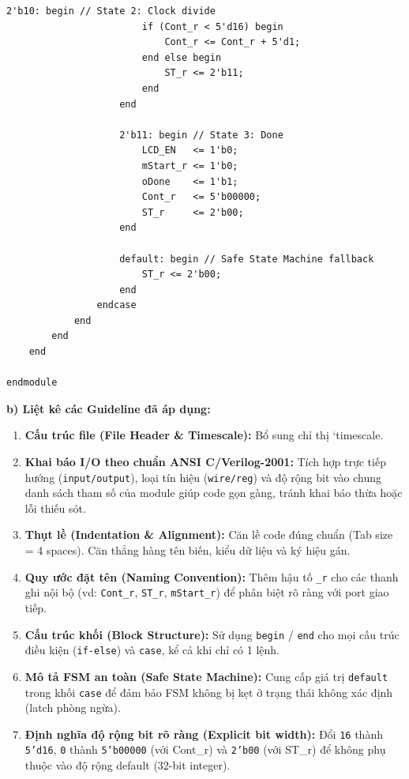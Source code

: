 \documentclass[12pt,a4paper]{article}
\begin{document}
\begin{lstlisting}[style=verilogstyle]
                    2'b10: begin // State 2: Clock divide
                        if (Cont_r < 5'd16) begin
                            Cont_r <= Cont_r + 5'd1;
                        end else begin
                            ST_r <= 2'b11;
                        end
                    end
                    
                    2'b11: begin // State 3: Done
                        LCD_EN   <= 1'b0;
                        mStart_r <= 1'b0;
                        oDone    <= 1'b1;
                        Cont_r   <= 5'b00000;
                        ST_r     <= 2'b00;
                    end
                    
                    default: begin // Safe State Machine fallback
                        ST_r <= 2'b00;
                    end
                endcase
            end
        end
    end

endmodule
\end{lstlisting}

\textbf{b) Liệt kê các Guideline đã áp dụng:}
\begin{enumerate}
    \item \textbf{Cấu trúc file (File Header \& Timescale):} Bổ sung chỉ thị `timescale.
    \item \textbf{Khai báo I/O theo chuẩn ANSI C/Verilog-2001:} Tích hợp trực tiếp hướng (\texttt{input/output}), loại tín hiệu (\texttt{wire/reg}) và độ rộng bit vào chung danh sách tham số của module giúp code gọn gàng, tránh khai báo thừa hoặc lỗi thiếu sót.
    \item \textbf{Thụt lề (Indentation \& Alignment):} Căn lề code đúng chuẩn (Tab size = 4 spaces). Căn thẳng hàng tên biến, kiểu dữ liệu và ký hiệu gán.
    \item \textbf{Quy ước đặt tên (Naming Convention):} Thêm hậu tố \texttt{\_r} cho các thanh ghi nội bộ (vd: \texttt{Cont\_r}, \texttt{ST\_r}, \texttt{mStart\_r}) để phân biệt rõ ràng với port giao tiếp.
    \item \textbf{Cấu trúc khối (Block Structure):} Sử dụng \texttt{begin} / \texttt{end} cho mọi cấu trúc điều kiện (\texttt{if-else}) và \texttt{case}, kể cả khi chỉ có 1 lệnh.
    \item \textbf{Mô tả FSM an toàn (Safe State Machine):} Cung cấp giá trị \texttt{default} trong khối \texttt{case} để đảm bảo FSM không bị kẹt ở trạng thái không xác định (latch phòng ngừa).
    \item \textbf{Định nghĩa độ rộng bit rõ ràng (Explicit bit width):} Đổi \texttt{16} thành \texttt{5'd16}, \texttt{0} thành \texttt{5'b00000} (với Cont\_r) và \texttt{2'b00} (với ST\_r) để không phụ thuộc vào độ rộng default (32-bit integer).
\end{enumerate}
\end{document}
